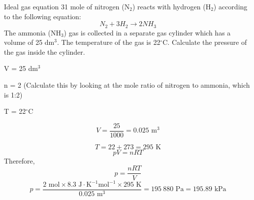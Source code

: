 \begin{wex}{Ideal gas equation 3}{1 mole of nitrogen (N$_{2}$) reacts with hydrogen (H$_{2}$) according to the following equation:
\begin{equation*}
N_{2} + 3H_{2} \rightarrow 2NH_{3}
\end{equation*}
The ammonia (NH$_{3}$) gas is collected in a separate gas cylinder which has a volume of 25 dm$^{3}$. The temperature of the gas is 22$^{\circ}$C. Calculate the pressure of the gas inside the cylinder.}{

V = 25 dm$^{3}$

n = 2 (Calculate this by looking at the mole ratio of nitrogen to ammonia, which is 1:2)

T = 22$^{\circ}$C


\begin{equation*}
V = \frac{25}{1000} = 0.025 \text{ m}^{3}
\end{equation*}

\begin{equation*}
T = 22 + 273 = 295 \text{ K}
\end{equation*}
\begin{equation*}
pV = nRT
\end{equation*}
Therefore,
\begin{equation*}
p = \frac{nRT}{V}
\end{equation*}
\begin{equation*}
p = \frac{2 \text{ mol} \times 8.3 \text{ J} \cdot \text{K}^{-1} \text{mol}^{-1} \times 295 \text{ K}}{0.025 \text{ m}^{3}} = 195~880 \text{ Pa} = 195.89 \text{ kPa}
\end{equation*}
}
\end{wex}

